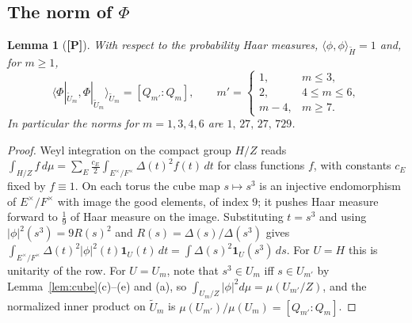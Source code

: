 \documentclass[11pt]{article}
\newcommand{\tH}{\widetilde H}
\newcommand{\tU}{\widetilde U}
\newcommand{\Ptag}{\textnormal{\textbf{[P]}}}
\theoremstyle{plain}
\newtheorem{lemma}[theorem]{Lemma}
\theoremstyle{definition}
\begin{document}
\subsection{The norm of $\Phi$}
\begin{lemma}[\Ptag]\label{lem:norm}
With respect to the probability Haar measures,
$\langle\phi,\phi\rangle_{\tH}=1$ and, for $m\ge1$,
\[
 \langle\Phi|_{\tU_m},\Phi|_{\tU_m}\rangle_{\tU_m}=[Q_{m'}:Q_m],\qquad
 m'=\begin{cases}1,&m\le3,\\2,&4\le m\le6,\\m-4,&m\ge7.\end{cases}
\]
In particular the norms for $m=1,3,4,6$ are $1,\,27,\,27,\,729$.
\end{lemma}
\begin{proof}
Weyl integration on the compact group $H/Z$ reads
$\int_{H/Z}f\,d\mu=\sum_E\tfrac{c_E}{2}\int_{E^\times/F^\times}\Delta(t)^2f(t)\,dt$
for class functions $f$, with constants $c_E$ fixed by $f\equiv1$.
On each torus the cube map $s\mapsto s^3$ is an injective endomorphism
of $E^\times/F^\times$ with image the good elements, of index $9$; it
pushes Haar measure forward to $\tfrac19$ of Haar measure on the image.
Substituting $t=s^3$ and using $|\phi|^2(s^3)=9R(s)^2$ and
$R(s)=\Delta(s)/\Delta(s^3)$ gives
$\int_{E^\times/F^\times}\Delta(t)^2|\phi|^2(t)\mathbf 1_{U}(t)\,dt
 =\int\Delta(s)^2\mathbf 1_{U}(s^3)\,ds$.
For $U=H$ this is unitarity of the row.  For $U=U_m$, note that
$s^3\in U_m$ iff $s\in U_{m'}$ by Lemma~\ref{lem:cube}(c)--(e) and (a),
so $\int_{U_m/Z}|\phi|^2d\mu=\mu(U_{m'}/Z)$, and the normalized inner
product on $\tU_m$ is $\mu(U_{m'})/\mu(U_m)=[Q_{m'}:Q_m]$.
\end{proof}
\end{document}
